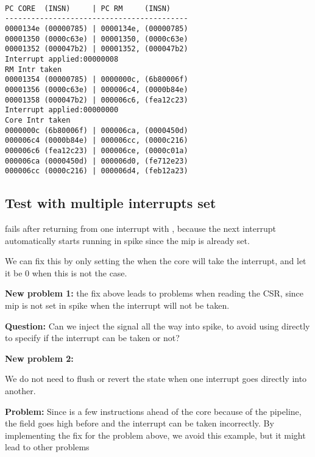 \begin{lstlisting}[label={lst:async_int_1},caption={Trace output from asynchronous interrupts without pipeline shell}]

PC CORE  (INSN)     | PC RM     (INSN)
------------------------------------------
0000134e (00000785) | 0000134e, (00000785) 
00001350 (0000c63e) | 00001350, (0000c63e) 
00001352 (000047b2) | 00001352, (000047b2) 
Interrupt applied:00000008
RM Intr taken
00001354 (00000785) | 0000000c, (6b80006f) 
00001356 (0000c63e) | 000006c4, (0000b84e) 
00001358 (000047b2) | 000006c6, (fea12c23) 
Interrupt applied:00000000
Core Intr taken
0000000c (6b80006f) | 000006ca, (0000450d) 
000006c4 (0000b84e) | 000006cc, (0000c216) 
000006c6 (fea12c23) | 000006ce, (0000c01a) 
000006ca (0000450d) | 000006d0, (fe712e23) 
000006cc (0000c216) | 000006d4, (feb12a23) 
\end{lstlisting}


\subsection{Test with multiple interrupts set}

 fails after returning from one interrupt with , because the next interrupt automatically starts running in spike since the mip is already set.

We can fix this by only setting the  when the core will take the interrupt, and let it be 0 when this is not the case.

\textbf{New problem 1:} the fix above leads to problems when reading the CSR, since mip is not set in spike when the interrupt will not be taken.

\textbf{Question:} Can we inject the  signal all the way into spike, to avoid using  directly to specify if the interrupt can be taken or not?

\textbf{New problem 2:}

We do not need to flush or revert the state when one interrupt goes directly into another. 


\textbf{Problem:} Since  is a few instructions ahead of the core because of the pipeline, the  field goes high before and the interrupt can be taken incorrectly. By implementing the fix for the problem above, we avoid this example, but it might lead to other problems


